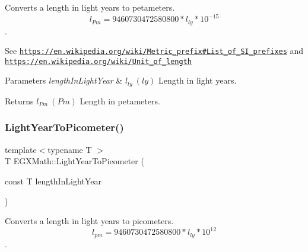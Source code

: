 Converts a length in light years to petameters. \[ l_{Pm}=9460730472580800 * l_{ly} * 10^{-15} \]. 

See \href{https://en.wikipedia.org/wiki/Metric_prefix#List_of_SI_prefixes}{\tt https\+://en.\+wikipedia.\+org/wiki/\+Metric\+\_\+prefix\#\+List\+\_\+of\+\_\+\+S\+I\+\_\+prefixes} and \href{https://en.wikipedia.org/wiki/Unit_of_length}{\tt https\+://en.\+wikipedia.\+org/wiki/\+Unit\+\_\+of\+\_\+length} 
\begin{DoxyParams}{Parameters}
{\em length\+In\+Light\+Year} & $ l_{ly}\ (ly)$ Length in light years. \\
\hline
\end{DoxyParams}
\begin{DoxyReturn}{Returns}
$ l_{Pm}\ (Pm)$ Length in petameters. 
\end{DoxyReturn}
\mbox{\label{group___e_g_x_math-_conversions-_length_conversions-_astronomical-_light_year-_s_i_ga6dc5dc3c9584f578c4a935552fb965b7}} 
\subsubsection{\texorpdfstring{Light\+Year\+To\+Picometer()}{LightYearToPicometer()}}
{\footnotesize\ttfamily template$<$typename T $>$ \\
T E\+G\+X\+Math\+::\+Light\+Year\+To\+Picometer (\begin{DoxyParamCaption}\item[{const T}]{length\+In\+Light\+Year }\end{DoxyParamCaption})}



Converts a length in light years to picometers. \[ l_{pm}=9460730472580800 * l_{ly} * 10^{12} \]. 

